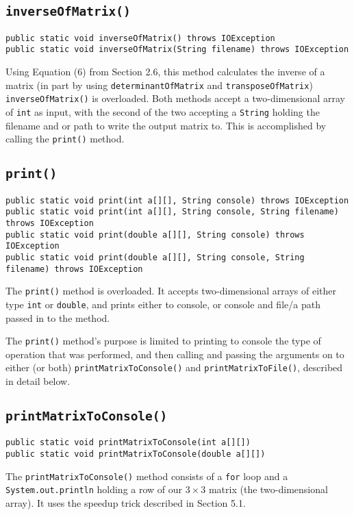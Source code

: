 \documentclass[12pt]{article}
\begin{document}
\subsection{\texttt{inverseOfMatrix()}}
\begin{verbatim}
public static void inverseOfMatrix() throws IOException
public static void inverseOfMatrix(String filename) throws IOException
\end{verbatim}
Using Equation (6) from Section 2.6, this method calculates the inverse of a matrix (in part by using \texttt{determinantOfMatrix} and \texttt{transposeOfMatrix}) \texttt{inverseOfMatrix()} is overloaded. Both methods accept a two-dimensional array of \texttt{int} as input, with the second of the two accepting a \texttt{String} holding the filename and or path to write the output matrix to. This is accomplished by calling the \texttt{print()} method.

\subsection{\texttt{print()}}
\begin{verbatim}
public static void print(int a[][], String console) throws IOException
public static void print(int a[][], String console, String filename) throws IOException
public static void print(double a[][], String console) throws IOException
public static void print(double a[][], String console, String filename) throws IOException
\end{verbatim}
The \texttt{print()} method is overloaded. It accepts two-dimensional arrays of either type \texttt{int} or \texttt{double}, and prints either to console, or console and file/a path passed in to the method.
\par The \texttt{print()} method's purpose is limited to printing to console the type of operation that was performed, and then calling and passing the arguments on to either (or both) \texttt{printMatrixToConsole()} and \texttt{printMatrixToFile()}, described in detail below.

\subsection{\texttt{printMatrixToConsole()}}
\begin{verbatim}
public static void printMatrixToConsole(int a[][])
public static void printMatrixToConsole(double a[][])
\end{verbatim}
The \texttt{printMatrixToConsole()} method consists of a \texttt{for} loop and a \texttt{System.out.println} holding a row of our $3\times3$ matrix (the two-dimensional array). It uses the speedup trick described in Section 5.1.
\end{document}
